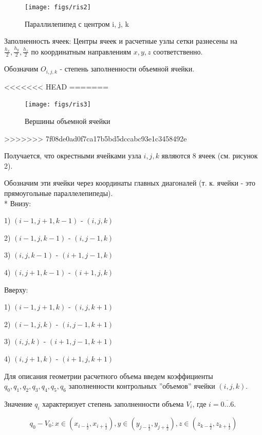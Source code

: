 \documentclass[12pt]{article}
\begin{document}
\begin{figure}[h!]
	\centering
	\texttt{[image: figs/ris2]}
	\caption{ Параллилепипед с центром i, j, k}
\end{figure}

Заполненность ячеек:
Центры ячеек и расчетные узлы сетки разнесены на $ \frac{h_x}{2}, \frac{h_y}{2}, \frac{h_z}{2} $ по координатным направлениям $x, y, z$ соответственно.

Обозначим $O_{i,j,k}$ - степень заполненности объемной ячейки. 

<<<<<<< HEAD
=======
\begin{figure}[h!]
	\centering
	\texttt{[image: figs/ris3]}
	\caption{ Вершины объемной ячейки}
\end{figure}

>>>>>>> 7f08de0ad0f7ca17b5bd5dccabc93e1c3458492e

Получается, что окрестными ячейками узла ${i,j,k}$ являются 8 ячеек (см. рисунок 2).

Обозначим эти ячейки через координаты главных диагоналей (т. к. ячейки - это прямоугольные параллелепипеды).
\\*
\newpage
Внизу:

1) ${(i-1,j+1,k-1)}$ - ${(i,j,k)}$ 

2) ${(i-1,j,k-1)}$ - ${(i,j-1,k)}$ 

3) ${(i,j,k-1)}$ - ${(i+1,j-1,k)}$ 

4) ${(i,j+1,k-1)}$ - ${(i+1,j,k)}$ 

Вверху:

1) ${(i-1,j+1,k)}$ - ${(i,j,k+1)}$ 

2) ${(i-1,j,k)}$ - ${(i,j-1,k+1)}$ 

3) ${(i,j,k)}$ - ${(i+1,j-1,k+1)}$ 

4) ${(i,j+1,k)}$ - ${(i+1,j,k+1)}$ 

{\color{red}{Читай метод конечных объемов (Рояк)}}


Для описания геометрии расчетного объема введем коэффициенты ${q_0, q_1,q_2,q_3,q_4,q_5,q_6}$ заполненности контрольных  ''объемов'' ячейки ${(i,j,k)}$.

Значение ${q_i}$ характеризует степень заполненности объема ${V_i}$, где $i=\overline{0...6}$.

\begin{equation*}
{q_0} - {V_0}: x\in (x_{i-\frac{1}{2} }, x_{i+\frac{1}{2} } ),  y\in (y_{j-\frac{1}{2} }, y_{j+\frac{1}{2} } ),  z\in (z_{k-\frac{1}{2} }, z_{k+\frac{1}{2} } )
\end{equation*}
\end{document}
